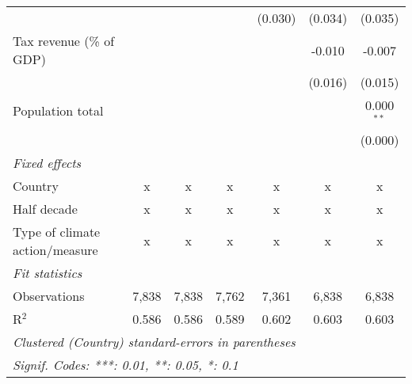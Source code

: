 \begin{tabular}{lcccccc}
                                                     &               &               &               & (0.030)       & (0.034)       & (0.035)\\   
   Tax revenue (\% of GDP)                           &               &               &               &               & -0.010        & -0.007\\   
                                                     &               &               &               &               & (0.016)       & (0.015)\\   
   Population total                                  &               &               &               &               &               & 0.000$^{**}$\\   
                                                     &               &               &               &               &               & (0.000)\\   
   \emph{Fixed effects}\\
   Country                                           & x             & x             & x             & x             & x             & x\\  
   Half decade                                       & x             & x             & x             & x             & x             & x\\  
   Type of climate action/measure                    & x             & x             & x             & x             & x             & x\\  
   \midrule \emph{Fit statistics}\\
   Observations                                      & 7,838         & 7,838         & 7,762         & 7,361         & 6,838         & 6,838\\  
   R$^2$                                             & 0.586         & 0.586         & 0.589         & 0.602         & 0.603         & 0.603\\  
   \midrule
   \multicolumn{7}{l}{\emph{Clustered (Country) standard-errors in parentheses}}\\
   \multicolumn{7}{l}{\emph{Signif. Codes: ***: 0.01, **: 0.05, *: 0.1}}\\
\end{tabular}
\par\endgroup


